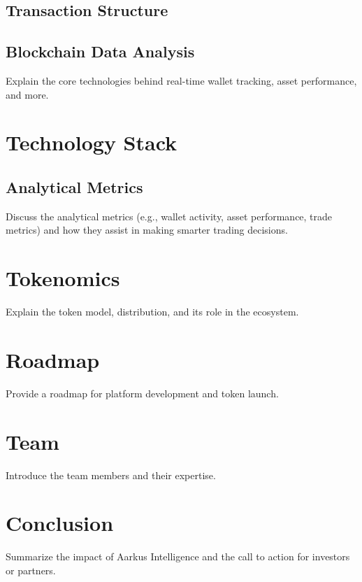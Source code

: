 \documentclass{article}
\begin{document}
\subsection{Transaction Structure}


\subsection{Blockchain Data Analysis}
Explain the core technologies behind real-time wallet tracking, asset performance, and more.

\section{Technology Stack}
\subsection{Analytical Metrics}
Discuss the analytical metrics (e.g., wallet activity, asset performance, trade metrics) and how they assist in making smarter trading decisions.

\section{Tokenomics}
Explain the token model, distribution, and its role in the ecosystem.

\section{Roadmap}
Provide a roadmap for platform development and token launch.

\section{Team}
Introduce the team members and their expertise.

\section{Conclusion}
Summarize the impact of Aarkus Intelligence and the call to action for investors or partners.
\end{document}
